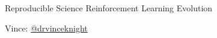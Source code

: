 \documentclass{beamer}
\begin{document}
    \begin{frame}
        \begin{center}
            \Huge
                Reproducible Science
                Reinforcement Learning
                Evolution

               \vfill

            \Large
               Vince: \href{https://twitter.com/drvinceknight}{@drvinceknight}\\
        \end{center}

    \end{frame}
\end{document}
